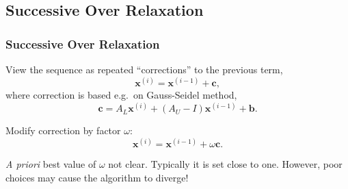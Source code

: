 \documentclass{beamer}
\newcommand{\bb}{{\boldsymbol{b}}}
\newcommand{\bx}{{\boldsymbol{x}}}
\newcommand{\bfm}[1]{{\boldsymbol{#1}}}
\begin{document}
\subsection{Successive Over Relaxation}

\begin{frame}
  \frametitle{Successive Over Relaxation}

  View the sequence as repeated ``corrections'' to the previous term,
  \begin{equation*}
    \bx^{(i)} = \bx^{(i-1)} + \bfm{c},
  \end{equation*}
  where correction is based e.g.\ on Gauss-Seidel method,
  \begin{equation*}
    \bfm{c} = A_L \bx^{(i)} + (A_U - I) \bx^{(i-1)} + \bb.
  \end{equation*} \pause

  Modify correction by factor $\omega$:
  \begin{equation*}
    \bx^{(i)} = \bx^{(i-1)} + \omega \bfm{c}.
  \end{equation*} \pause

  \emph{A priori} best value of $\omega$ not clear.  Typically it is
  set close to one. However, poor choices may cause the algorithm to
  diverge!

\end{frame}
\end{document}
